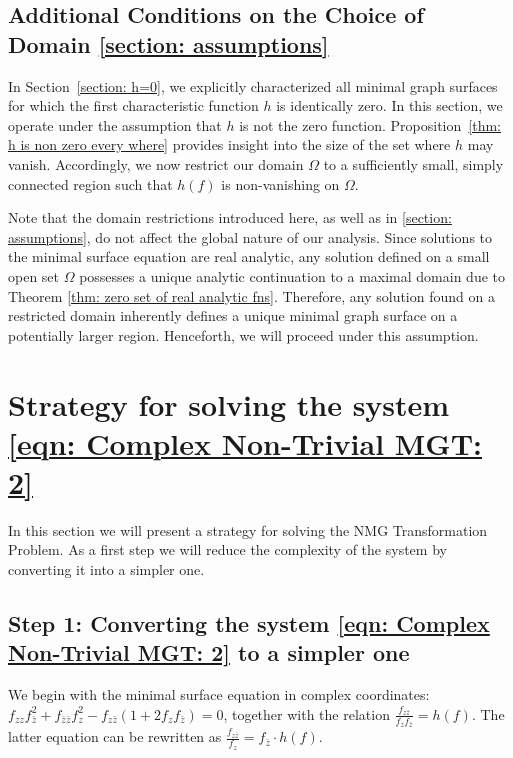\documentclass[12pt]{article}
\theoremstyle{plain}
\theoremstyle{definition}
\theoremstyle{remark}
\begin{document}
  \subsection{Additional Conditions on the Choice of Domain \ref{section: assumptions}}\label{section: assumption 2}
  
  In Section~\ref{section: h=0}, we explicitly characterized all minimal graph surfaces for which the first characteristic function \(h\) is identically zero. In this section, we operate under the assumption that \(h\) is not the zero function. Proposition~\ref{thm: h is non zero every where} provides insight into the size of the set where \(h\) may vanish. Accordingly, we now restrict our domain \(\Omega\) to a sufficiently small, simply connected region such that \(h(f)\) is non-vanishing on \(\Omega\).
  
  Note that the domain restrictions introduced here, as well as in \ref{section: assumptions}, do not affect the global nature of our analysis. Since solutions to the minimal surface equation are real analytic, any solution defined on a small open set \(\Omega\) possesses a unique analytic continuation to a maximal domain due to Theorem \ref{thm: zero set of real analytic fns}. Therefore, any solution found on a restricted domain inherently defines a unique minimal graph surface on a potentially larger region. Henceforth, we will proceed under this assumption.
  
   \section{Strategy for solving the system \ref{eqn: Complex Non-Trivial MGT: 2}}
   In this section we will present a strategy for solving the NMG Transformation Problem. As a first step we will reduce the complexity of the system by converting it into a simpler one.

   \subsection{Step 1: Converting the system \ref{eqn: Complex Non-Trivial MGT: 2} to a simpler one}
   \label{section: Step 1}
    We begin with the minimal surface equation in complex coordinates: \(f_{zz}f_{\bar{z}}^2 + f_{\bar{z}\bar{z}}f_z^2 - f_{z\bar{z}}(1 + 2f_z f_{\bar{z}}) = 0\), together with the relation \(\frac{f_{z\bar{z}}}{f_z f_{\bar{z}}} = h(f)\). The latter equation can be rewritten as \( \frac{f_{z\bar{z}}}{f_z} = f_{\bar{z}} \cdot h(f)\). 
\end{document}
